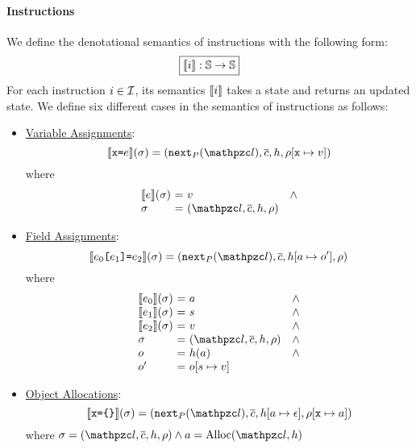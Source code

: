 \paragraph{Instructions} We define the denotational semantics of instructions
with the following form:
\[
  \framebox{$\sem{\inst}: \stset \rightarrow \stset$}
\]
For each instruction $i \in \mathcal{I}$, its semantics $\llbracket{i}\rrbracket$ takes a
state and returns an updated state. We define six different cases in the
semantics of instructions as follows:

\begin{itemize}
  \item \underline{Variable Assignments}:
    \[
      \sem{\varx \kweq \expr}(\st) =
      (\getnext{\prog}(\lab), \ctxts, \heap, \env[\varx \mapsto \val])
    \]
    where
    \[
      \begin{array}{l@{~}c@{~}ll}
        \sem{\expr}(\st) &=& \val &\wedge\\
        \st &=& (\lab, \ctxts, \heap, \env)\\
      \end{array}
    \]

  \item \underline{Field Assignments}:
    \[
      \sem{\expr_0 \kwsl \expr_1 \kwsr \kweq \expr_2}(\st) =
      (\getnext{\prog}(\lab), \ctxts, \heap[\addr \mapsto \obj'], \env)
    \]
    where
    \[
      \begin{array}{l@{~}c@{~}ll}
        \sem{\expr_0}(\st) &=& \addr &\wedge\\
        \sem{\expr_1}(\st) &=& \str &\wedge\\
        \sem{\expr_2}(\st) &=& \val &\wedge\\
        \st &=& (\lab, \ctxts, \heap, \env) &\wedge\\
        \obj &=& \heap(\addr) &\wedge\\
        \obj' &=& \obj[\str \mapsto \val]\\
      \end{array}
    \]

  \item \underline{Object Allocations}:
    \[
      \sem{\varx \kweq \kwcl \kwcr}(\st) =
      (\getnext{\prog}(\lab), \ctxts, \heap[\addr \mapsto \epsilon], \env[\varx \mapsto
      \addr])
    \]
    where $\st = (\lab, \ctxts, \heap, \env) \wedge \addr =
    \text{Alloc}(\lab, \heap)$


\end{itemize}
